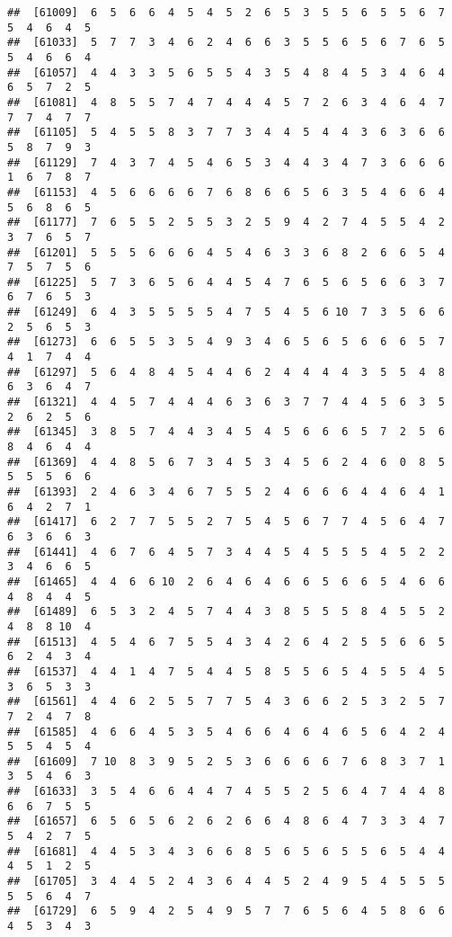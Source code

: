 \documentclass[
]{book}
\begin{document}
\begin{verbatim}
##  [61009]  6  5  6  6  4  5  4  5  2  6  5  3  5  5  6  5  5  6  7  5  4  6  4  5
##  [61033]  5  7  7  3  4  6  2  4  6  6  3  5  5  6  5  6  7  6  5  5  4  6  6  4
##  [61057]  4  4  3  3  5  6  5  5  4  3  5  4  8  4  5  3  4  6  4  6  5  7  2  5
##  [61081]  4  8  5  5  7  4  7  4  4  4  5  7  2  6  3  4  6  4  7  7  7  4  7  7
##  [61105]  5  4  5  5  8  3  7  7  3  4  4  5  4  4  3  6  3  6  6  5  8  7  9  3
##  [61129]  7  4  3  7  4  5  4  6  5  3  4  4  3  4  7  3  6  6  6  1  6  7  8  7
##  [61153]  4  5  6  6  6  6  7  6  8  6  6  5  6  3  5  4  6  6  4  5  6  8  6  5
##  [61177]  7  6  5  5  2  5  5  3  2  5  9  4  2  7  4  5  5  4  2  3  7  6  5  7
##  [61201]  5  5  5  6  6  6  4  5  4  6  3  3  6  8  2  6  6  5  4  7  5  7  5  6
##  [61225]  5  7  3  6  5  6  4  4  5  4  7  6  5  6  5  6  6  3  7  6  7  6  5  3
##  [61249]  6  4  3  5  5  5  5  4  7  5  4  5  6 10  7  3  5  6  6  2  5  6  5  3
##  [61273]  6  6  5  5  3  5  4  9  3  4  6  5  6  5  6  6  6  5  7  4  1  7  4  4
##  [61297]  5  6  4  8  4  5  4  4  6  2  4  4  4  4  3  5  5  4  8  6  3  6  4  7
##  [61321]  4  4  5  7  4  4  4  6  3  6  3  7  7  4  4  5  6  3  5  2  6  2  5  6
##  [61345]  3  8  5  7  4  4  3  4  5  4  5  6  6  6  5  7  2  5  6  8  4  6  4  4
##  [61369]  4  4  8  5  6  7  3  4  5  3  4  5  6  2  4  6  0  8  5  5  5  5  6  6
##  [61393]  2  4  6  3  4  6  7  5  5  2  4  6  6  6  4  4  6  4  1  6  4  2  7  1
##  [61417]  6  2  7  7  5  5  2  7  5  4  5  6  7  7  4  5  6  4  7  6  3  6  6  3
##  [61441]  4  6  7  6  4  5  7  3  4  4  5  4  5  5  5  4  5  2  2  3  4  6  6  5
##  [61465]  4  4  6  6 10  2  6  4  6  4  6  6  5  6  6  5  4  6  6  4  8  4  4  5
##  [61489]  6  5  3  2  4  5  7  4  4  3  8  5  5  5  8  4  5  5  2  4  8  8 10  4
##  [61513]  4  5  4  6  7  5  5  4  3  4  2  6  4  2  5  5  6  6  5  6  2  4  3  4
##  [61537]  4  4  1  4  7  5  4  4  5  8  5  5  6  5  4  5  5  4  5  3  6  5  3  3
##  [61561]  4  4  6  2  5  5  7  7  5  4  3  6  6  2  5  3  2  5  7  7  2  4  7  8
##  [61585]  4  6  6  4  5  3  5  4  6  6  4  6  4  6  5  6  4  2  4  5  5  4  5  4
##  [61609]  7 10  8  3  9  5  2  5  3  6  6  6  6  7  6  8  3  7  1  3  5  4  6  3
##  [61633]  3  5  4  6  6  4  4  7  4  5  5  2  5  6  4  7  4  4  8  6  6  7  5  5
##  [61657]  6  5  6  5  6  2  6  2  6  6  4  8  6  4  7  3  3  4  7  5  4  2  7  5
##  [61681]  4  4  5  3  4  3  6  6  8  5  6  5  6  5  5  6  5  4  4  4  5  1  2  5
##  [61705]  3  4  4  5  2  4  3  6  4  4  5  2  4  9  5  4  5  5  5  5  5  6  4  7
##  [61729]  6  5  9  4  2  5  4  9  5  7  7  6  5  6  4  5  8  6  6  4  5  3  4  3

\end{verbatim}
\end{document}
